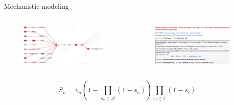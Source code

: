 \documentclass[compress,ignorenonframetext,aspectratio=1610,handout]{beamer}
\begin{document}
\begin{frame}{Mechanistic modeling}

	\begin{columns}
		\begin{column}{0.6\textwidth}
			\begin{figure}
				\centering
				\includegraphics[width=0.99\textwidth]{figs/methods/circuit.png}
			\end{figure}
		\end{column}
		\begin{column}{0.4\textwidth}
			\begin{figure}
				\centering
				\includegraphics[width=0.99\textwidth]{figs/methods/hipathia_paper.png}
			\end{figure}
		\end{column}
	\end{columns}

	\pause

	\vspace*{2em}
	{\normalsize
		\[
			S_{n} = v_{n} \left( 1 - \prod_{s_{a} \in \mathcal{A}} \left( 1 - s_{a} \right) \right) \prod_{s_{i} \in \mathcal{I}} \left( 1 - s_{i} \right)
		\]
	}
\end{frame}
\end{document}
